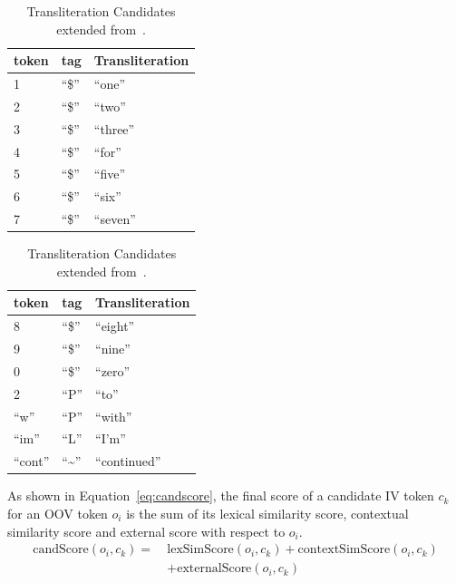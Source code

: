 \documentclass[a4paper,onesided,12pt]{report}
\begin{document}
\begin{table}[ht]
  \caption{Transliteration Candidates extended from~\cite{Gouws:2011:CBL:2021109.2021113}.}
  \begin{minipage}[c]{0.5\linewidth}
    \begin{tabular}[l]{|l|l|l|}
    \hline
    \textbf{token} & \textbf{tag} & \textbf{Transliteration} \\\hline
    1 & ``\$'' & ``one'' \\\hline
    2 & ``\$'' & ``two'' \\\hline
    3 & ``\$'' & ``three'' \\\hline
    4 & ``\$'' & ``for'' \\\hline
    5 & ``\$'' & ``five'' \\\hline
    6 & ``\$'' & ``six'' \\\hline
    7 & ``\$'' & ``seven'' \\\hline
  \end{tabular}
\end{minipage}
  \begin{minipage}[c]{0.5\linewidth}
    \begin{tabular}[l]{|l|l|l|}
    \hline
    \textbf{token} & \textbf{tag} & \textbf{Transliteration} \\\hline
    8 & ``\$'' & ``eight'' \\\hline
    9 & ``\$'' & ``nine'' \\\hline
    0 & ``\$'' & ``zero'' \\\hline
    2 & ``P''  & ``to'' \\\hline
    ``w'' & ``P''  & ``with'' \\\hline
    ``im'' & ``L''  & ``I'm'' \\\hline
    ``cont'' & ``\textasciitilde''  & ``continued'' \\\hline
  \end{tabular}
  \end{minipage}
\label{tab:transliteral}
\end{table}


As shown in Equation~\ref{eq:candscore}, the final score of a candidate IV token $c_k$ for an OOV token $o_i$ is the sum of its lexical similarity score, contextual similarity score and external score with respect to $o_i$.
\begin{equation}
\begin{aligned}
\text{candScore}(o_i,c_k) = ~ & \text{lexSimScore}(o_i,c_k) + \text{contextSimScore}(o_i,c_k) \\
& + \text{externalScore}(o_i,c_k)
\end{aligned}
\label{eq:candscore}
\end{equation}
\end{document}
